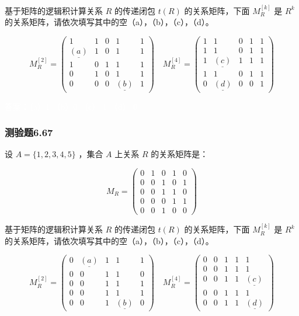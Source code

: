 \documentclass[UTF8, heading=true]{ctexart}
\begin{document}
基于矩阵的逻辑积计算关系 $R$ 的传递闭包 $t(R)$ 的关系矩阵，下面 $M_R^{[k]}$ 是 $R^k$ 的关系矩阵，请依次填写其中的空（a），（b），（c），（d）。

$$
M_R^{[2]}=\left(\begin{array}{ccccc}
1 & 1 & 0 & 1 & 1 \\
\underline{(a)} & 1 & 0 & 1 & 1 \\
1 & 0 & 1 & 1 & 1 \\
0 & 1 & 0 & 1 & 1 \\
0 & 0 & 0 & \underline{(b)} & 1
\end{array}\right) \quad M_R^{[4]}=\left(\begin{array}{ccccc}
1 & 1 & 0 & 1 & 1 \\
1 & 1 & 0 & 1 & 1 \\
1 & \underline{(c)} & 1 & 1 & 1 \\
1 & 1 & 0 & 1 & 1 \\
0 & \underline{(d)} & 0 & 0 & 1
\end{array}\right)
$$


\textcolor{white}{答案：（a）1 （b）0 （c） 1 （d） 0}

\subsubsection{测验题6.67}

设 $A=\{1,2,3,4,5\}$ ，集合 $A$ 上关系 $R$ 的关系矩阵是：

$$
M_R=\left(\begin{array}{lllll}
0 & 1 & 0 & 1 & 0 \\
0 & 0 & 1 & 0 & 1 \\
0 & 0 & 1 & 1 & 0 \\
0 & 0 & 0 & 1 & 1 \\
0 & 0 & 1 & 0 & 0
\end{array}\right)
$$

基于矩阵的逻辑积计算关系 $R$ 的传递闭包 $t(R)$ 的关系矩阵，下面 $M_R^{[k]}$ 是 $R^k$ 的关系矩阵，请依次填写其中的空（a），（b），（c），（d）。

$$
M_R^{[2]}=\left(\begin{array}{ccccc}
0 & \underline{(a)} & 1 & 1 & 1 \\
0 & 0 & 1 & 1 & 0 \\
0 & 0 & 1 & 1 & 1 \\
0 & 0 & 1 & 1 & 1 \\
0 & 0 & 1 & \underline{(b)} & 0
\end{array}\right) \quad M_R^{[4]}=\left(\begin{array}{ccccc}
0 & 0 & 1 & 1 & 1 \\
0 & 0 & 1 & 1 & 1 \\
0 & 0 & 1 & 1 & \underline{(c)} \\
0 & 0 & 1 & 1 & 1 \\
0 & 0 & 1 & 1 & \underline{(d)}
\end{array}\right)
$$
\end{document}
